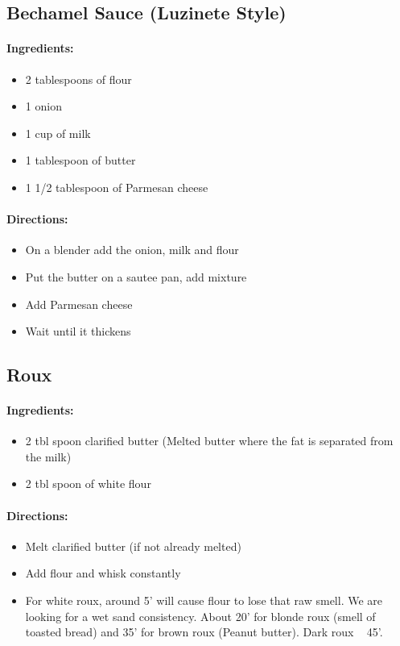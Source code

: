 \documentclass{article}
\begin{document}
\subsection{Bechamel Sauce (Luzinete Style)}

\paragraph{Ingredients:}

\begin{itemize}
	\item 2 tablespoons of flour
	\item 1 onion
	\item 1 cup of milk
	\item 1 tablespoon of butter
	\item 1 1/2 tablespoon of Parmesan cheese
\end{itemize}

\paragraph{Directions:}
\begin{itemize}
	\item On a blender add the onion, milk and flour
	\item Put the butter on a sautee pan, add mixture
	\item Add Parmesan cheese
	\item Wait until it thickens
\end{itemize}

\subsection{Roux}

\paragraph{Ingredients:}

\begin{itemize}
	\item 2 tbl spoon clarified butter (Melted butter where the fat is separated from the milk)
	\item 2 tbl spoon of white flour
\end{itemize}

\paragraph{Directions:}
\begin{itemize}
	\item Melt clarified butter (if not already melted)
	\item Add flour and whisk constantly
	\item For white roux, around 5' will cause flour to lose that raw smell. We are looking for a wet sand consistency. About 20' for blonde roux (smell of toasted bread) and 35' for brown roux (Peanut butter). Dark roux ~ 45'.
\end{itemize}
\end{document}
